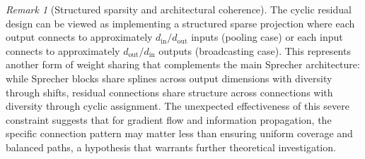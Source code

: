 \documentclass{article}
\theoremstyle{plain}
\theoremstyle{definition}
\theoremstyle{remark}
\newtheorem{remark}{Remark}
\begin{document}
\begin{remark}[Structured sparsity and architectural coherence]
The cyclic residual design can be viewed as implementing a structured sparse projection where each output connects to approximately $d_{\mathrm{in}}/d_{\mathrm{out}}$ inputs (pooling case) or each input connects to approximately $d_{\mathrm{out}}/d_{\mathrm{in}}$ outputs (broadcasting case). This represents another form of weight sharing that complements the main Sprecher architecture: while Sprecher blocks share splines across output dimensions with diversity through shifts, residual connections share structure across connections with diversity through cyclic assignment. The unexpected effectiveness of this severe constraint suggests that for gradient flow and information propagation, the specific connection pattern may matter less than ensuring uniform coverage and balanced paths, a hypothesis that warrants further theoretical investigation.
\end{remark}
\end{document}
